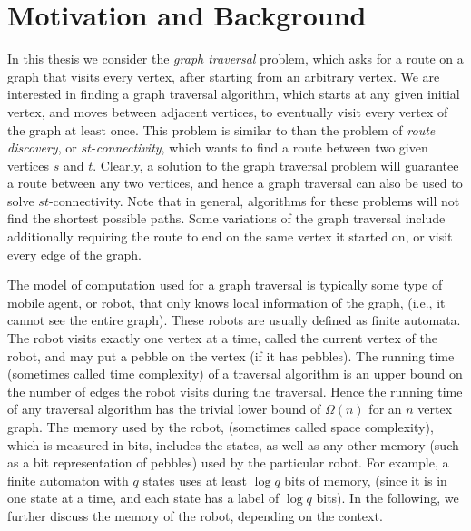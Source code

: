 \documentclass[12pt,letterpaper,oneside]{book}
\begin{document}



\section{Motivation and Background}
In this thesis we consider the \emph{graph traversal} problem, which asks for a route on a graph that visits every vertex, after 
starting from an arbitrary vertex.  We are interested in finding a graph 
traversal algorithm, which starts at any given initial vertex, and moves between adjacent vertices, to eventually visit 
every vertex of the graph at least once.   
This problem is similar to than the problem of \emph{route discovery}, or $st$-\emph{connectivity}, 
which wants to find a route between two given vertices $s$ and $t$.  
Clearly, a solution to the graph traversal problem will guarantee a route between any two vertices, and hence a graph traversal can 
also be used to solve $st$-connectivity.  %
Note 
that in general, algorithms for these problems will not find the shortest possible paths.  Some variations of the graph traversal include 
additionally requiring 
the route to end on the same vertex it started on, or visit every edge of the graph.  %


The model of computation used for a graph traversal is 
typically some type of mobile agent, or robot, that only knows local information of the graph, (i.e., it cannot 
see the entire graph).   
These robots are usually defined as finite automata.  The robot visits exactly one vertex at a time, called the 
current vertex of the robot, and may put a pebble on the vertex (if it has pebbles).  
The running time (sometimes called time complexity) of a traversal algorithm is an 
upper bound on the number of edges the robot visits during the traversal.  
Hence the running time of any traversal algorithm has the trivial lower bound of $\Omega(n)$ for 
an $n$ vertex graph.  The memory used by the robot, (sometimes called space complexity), which is measured in bits, includes the 
states, as well as any other memory (such as a bit representation of pebbles) used by the particular robot.  For example, a 
finite automaton with $q$ states uses at least $\log q$ bits of memory, (since it is in one state at a time, and each 
state has a label of $\log q$ bits).  In the following, we further discuss the memory of the robot, 
depending on the context.  
\end{document}
